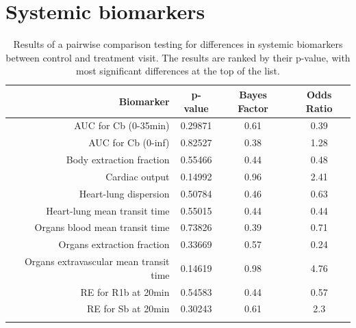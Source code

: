 \documentclass{epflreport}%
\begin{document}
\section{Systemic biomarkers}%
\label{sec:Systemicbiomarkers}%

%
\begin{longtable}{rccc}%
\hline%
Biomarker&p{-}value&Bayes Factor&Odds Ratio\\%
\hline%
AUC for Cb (0{-}35min)&0.29871&0.61&0.39\\%
AUC for Cb (0{-}inf)&0.82527&0.38&1.28\\%
Body extraction fraction&0.55466&0.44&0.48\\%
Cardiac output&0.14992&0.96&2.41\\%
Heart{-}lung dispersion&0.50784&0.46&0.63\\%
Heart{-}lung mean transit time&0.55015&0.44&0.44\\%
Organs blood mean transit time&0.73826&0.39&0.71\\%
Organs extraction fraction&0.33669&0.57&0.24\\%
Organs extravascular mean transit time&0.14619&0.98&4.76\\%
RE for R1b at 20min&0.54583&0.44&0.57\\%
RE for Sb at 20min&0.30243&0.61&2.3\\%
\hline%
\caption{Results of a pairwise comparison testing for differences in systemic biomarkers between control and treatment visit. The results are ranked by their p-value, with most significant differences at the top of the list.} \\%
\end{longtable}%
\end{document}
